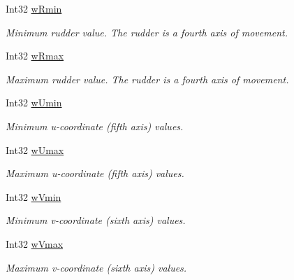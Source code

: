 \begin{DoxyCompactItemize}
Int32 \hyperlink{struct_tao_1_1_platform_1_1_windows_1_1_winmm_1_1_j_o_y_c_a_p_s_a6b35b89eb4a429bf27dd094cab0117cb}{wRmin}
\begin{DoxyCompactList}\small\item\em Minimum rudder value. The rudder is a fourth axis of movement. \item\end{DoxyCompactList}\item 
Int32 \hyperlink{struct_tao_1_1_platform_1_1_windows_1_1_winmm_1_1_j_o_y_c_a_p_s_ae35184e36b3152a51149aa79bab4e7d0}{wRmax}
\begin{DoxyCompactList}\small\item\em Maximum rudder value. The rudder is a fourth axis of movement. \item\end{DoxyCompactList}\item 
Int32 \hyperlink{struct_tao_1_1_platform_1_1_windows_1_1_winmm_1_1_j_o_y_c_a_p_s_a0da0d4c01feffc90ac628a2ce15dad59}{wUmin}
\begin{DoxyCompactList}\small\item\em Minimum u-\/coordinate (fifth axis) values. \item\end{DoxyCompactList}\item 
Int32 \hyperlink{struct_tao_1_1_platform_1_1_windows_1_1_winmm_1_1_j_o_y_c_a_p_s_a966ca99dc4d7ecaaa313a8196921b0b2}{wUmax}
\begin{DoxyCompactList}\small\item\em Maximum u-\/coordinate (fifth axis) values. \item\end{DoxyCompactList}\item 
Int32 \hyperlink{struct_tao_1_1_platform_1_1_windows_1_1_winmm_1_1_j_o_y_c_a_p_s_a8218e50d9343d5ee3e1422cfd581659d}{wVmin}
\begin{DoxyCompactList}\small\item\em Minimum v-\/coordinate (sixth axis) values. \item\end{DoxyCompactList}\item 
Int32 \hyperlink{struct_tao_1_1_platform_1_1_windows_1_1_winmm_1_1_j_o_y_c_a_p_s_a14588e8381d7f30de70a50bdfa663934}{wVmax}
\begin{DoxyCompactList}\small\item\em Maximum v-\/coordinate (sixth axis) values. \item\end{DoxyCompactList}\item 

\end{DoxyCompactItemize}
